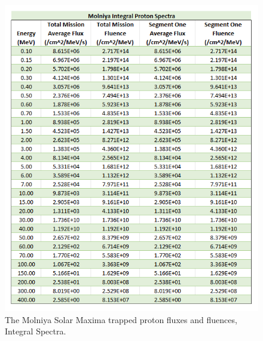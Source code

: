 \documentclass[11pt]{article}
\begin{document}
\begin{figure}[!b]
    \centering
    \begin{minipage}{\dimexpr.5\textwidth-1em}
        \centering
        \includegraphics[width=1\linewidth]{Molinya_IPS.png}
        \caption{The Molniya Solar Maxima trapped proton fluxes and fluences, Integral Spectra.}
        \label{fig:MolniyaIPS}
    \end{minipage}\hfill
    \begin{minipage}{\dimexpr.5\textwidth-1em}
        \centering

\end{minipage}
\end{figure}
\end{document}
